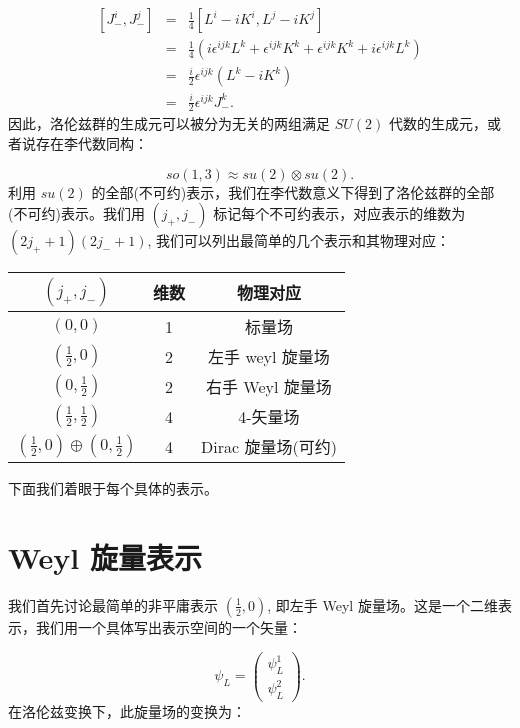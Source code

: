 \documentclass[10pt,UTF8]{ctexart}
\providecommand{\tabularnewline}{\\}
\begin{document}
\begin{eqnarray}
\left[J_{-}^{i},J_{-}^{j}\right] & = & \frac{1}{4}\left[L^{i}-iK^{i},L^{j}-iK^{j}\right]\nonumber \\
 & = & \frac{1}{4}\left(i\epsilon^{ijk}L^{k}+\epsilon^{ijk}K^{k}+\epsilon^{ijk}K^{k}+i\epsilon^{ijk}L^{k}\right)\nonumber \\
 & = & \frac{i}{2}\epsilon^{ijk}\left(L^{k}-iK^{k}\right)\nonumber \\
 & = & \frac{i}{2}\epsilon^{ijk}J_{-}^{k}.
\end{eqnarray}
因此，洛伦兹群的生成元可以被分为无关的两组满足 $SU(2)$ 代数的生成元，或者说存在李代数同构：

\begin{equation}
so(1,3)\approx su(2)\otimes su(2).
\end{equation}
利用 $su(2)$ 的全部(不可约)表示，我们在李代数意义下得到了洛伦兹群的全部(不可约)表示。我们用 $\left(j_{+},j_{-}\right)$
标记每个不可约表示，对应表示的维数为 $\left(2j_{+}+1\right)\left(2j_{-}+1\right)$,
我们可以列出最简单的几个表示和其物理对应：
\begin{doublespace}
\begin{center}
\begin{tabular}{ccc}
\hline 
$(j_{+},j_{-})$ & 维数 & 物理对应\tabularnewline
\hline 
\hline 
$(0,0)$ & 1 & 标量场\tabularnewline
$\left(\frac{1}{2},0\right)$ & 2 & 左手 weyl 旋量场\tabularnewline
$\left(0,\frac{1}{2}\right)$ & 2 & 右手 Weyl 旋量场\tabularnewline
$\left(\frac{1}{2},\frac{1}{2}\right)$ & 4 & 4-矢量场\tabularnewline
$\left(\frac{1}{2},0\right)\oplus\left(0,\frac{1}{2}\right)$ & 4 & Dirac 旋量场(可约)\tabularnewline
\hline 
\end{tabular}
\par\end{center}
\end{doublespace}

\begin{flushleft}
下面我们着眼于每个具体的表示。
\par\end{flushleft}

\section*{Weyl 旋量表示}
\noindent
我们首先讨论最简单的非平庸表示 $\left(\frac{1}{2},0\right)$, 即左手 Weyl 旋量场。这是一个二维表示，我们用一个具体写出表示空间的一个矢量：

\begin{equation}
\psi_{L}=\left(\begin{array}{c}
\psi_{L}^{1}\\
\psi_{L}^{2}
\end{array}\right).
\end{equation}
在洛伦兹变换下，此旋量场的变换为：
\end{document}
